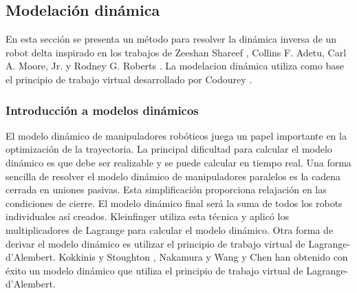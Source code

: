         


        








    \newpage

    \subsection{Modelación dinámica}\label{cap4_mb_subsection_dina}
    
        En esta sección se presenta un método para resolver la dinámica inversa de un robot delta inspirado en los trabajos de Zeeshan Shareef \cite{Path_Planning_and_Trajectory_Optimization}, Collins F. Adetu, Carl A. Moore, Jr. y Rodney G. Roberts \cite{dynamic_omega3}. La modelacion dinámica utiliza como base el principio de trabajo virtual desarrollado por Codourey \cite{Codourey_decoupling}.

 
        
        \subsubsection{Introducción a modelos dinámicos}
    
        El modelo dinámico de manipuladores robóticos juega un papel importante en la optimización de la trayectoria. La principal dificultad para calcular el modelo dinámico es que debe ser realizable y se puede calcular en tiempo real. Una forma sencilla de resolver el modelo dinámico de manipuladores paralelos es la cadena cerrada en uniones pasivas. Esta simplificación proporciona relajación en las condiciones de cierre. El modelo dinámico final será la suma de todos los robots individuales así creados. Kleinfinger \cite{kleinfinger1986modelisation} utiliza esta técnica y aplicó los multiplicadores de Lagrange para calcular el modelo dinámico. Otra forma de derivar el modelo dinámico es utilizar el principio de trabajo virtual de Lagrange-d’Alembert. Kokkinis y Stoughton \cite{kokkinis1991dynamics}, Nakamura \cite{NakamuraYoshihiko1991Ar} y Wang y Chen \cite{wang1994dynamic} han obtenido con éxito un modelo dinámico que utiliza el principio de trabajo virtual de Lagrange-d’Alembert.
        
